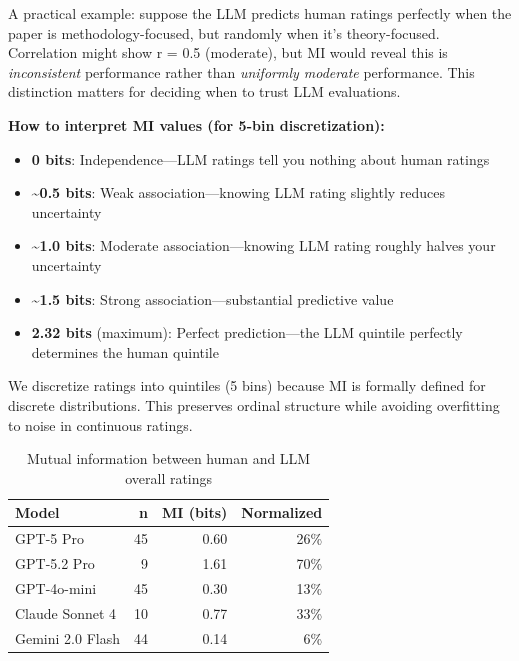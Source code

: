 \documentclass[
  11pt,
  letterpaper,
  DIV=11,
  numbers=noendperiod]{scrreprt}
\providecommand{\tightlist}{%
  \setlength{\itemsep}{0pt}\setlength{\parskip}{0pt}}
\begin{document}
A practical example: suppose the LLM predicts human ratings perfectly
when the paper is methodology-focused, but randomly when it's
theory-focused. Correlation might show r = 0.5 (moderate), but MI would
reveal this is \emph{inconsistent} performance rather than
\emph{uniformly moderate} performance. This distinction matters for
deciding when to trust LLM evaluations.

\textbf{How to interpret MI values (for 5-bin discretization):}

\begin{itemize}
\tightlist
\item
  \textbf{0 bits}: Independence---LLM ratings tell you nothing about
  human ratings
\item
  \textbf{\textasciitilde0.5 bits}: Weak association---knowing LLM
  rating slightly reduces uncertainty
\item
  \textbf{\textasciitilde1.0 bits}: Moderate association---knowing LLM
  rating roughly halves your uncertainty
\item
  \textbf{\textasciitilde1.5 bits}: Strong association---substantial
  predictive value
\item
  \textbf{2.32 bits} (maximum): Perfect prediction---the LLM quintile
  perfectly determines the human quintile
\end{itemize}

We discretize ratings into quintiles (5 bins) because MI is formally
defined for discrete distributions. This preserves ordinal structure
while avoiding overfitting to noise in continuous ratings.

\begin{longtable}[]{@{}lrrr@{}}

\caption{\label{tbl-mutual-info}Mutual information between human and LLM
overall ratings}

\tabularnewline

\toprule\noalign{}
Model & n & MI (bits) & Normalized \\
\midrule\noalign{}
\endhead
\bottomrule\noalign{}
\endlastfoot
GPT-5 Pro & 45 & 0.60 & 26\% \\
GPT-5.2 Pro & 9 & 1.61 & 70\% \\
GPT-4o-mini & 45 & 0.30 & 13\% \\
Claude Sonnet 4 & 10 & 0.77 & 33\% \\
Gemini 2.0 Flash & 44 & 0.14 & 6\% \\

\end{longtable}
\end{document}
